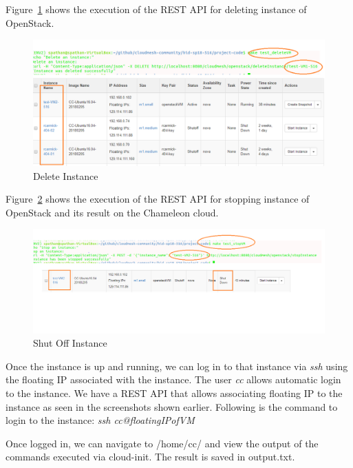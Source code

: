 Figure~\ref{fig:deleteVM} shows the execution of the REST API for deleting
instance of OpenStack.
\begin{figure}[!ht]
        \centering\includegraphics[width=\columnwidth]{images/deleteVM.png}
        \caption{Delete Instance}
        \label{fig:deleteVM}
\end{figure}

Figure~\ref{fig:stopVM} shows the execution of the REST API for stopping
instance of OpenStack and its result on the Chameleon cloud.

\begin{figure}[!ht]
        \centering\includegraphics[width=\columnwidth]{images/stopVM.png}
        \caption{Shut Off Instance}
        \label{fig:stopVM}
\end{figure}

Once the instance is up and running, we can log in to that instance via
\textit{ssh} using the floating IP associated with the instance. The user
\textit{cc} allows automatic login to the instance. We have a REST API that
allows associating floating IP to the instance as seen in the screenshots shown
earlier. Following is the command to login to the instance:
\textit{ssh cc@floatingIPofVM}

Once logged in, we can navigate to /home/cc/ and view the output of the 
commands executed via cloud-init. The result is saved in output.txt.

